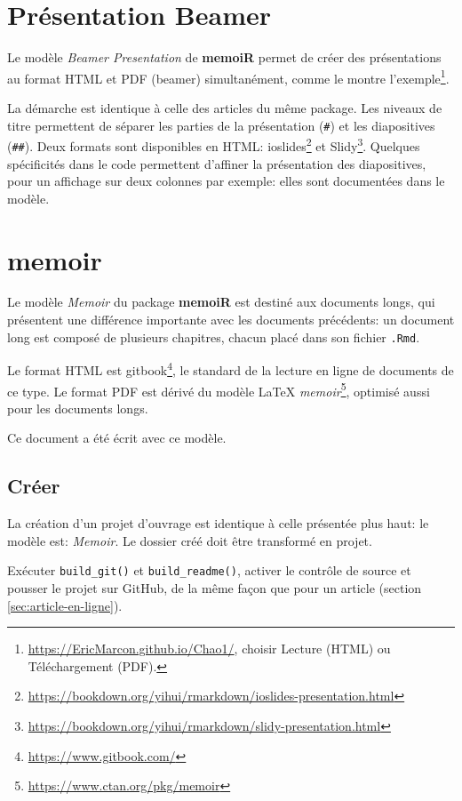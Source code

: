 \documentclass[
  12pt,
  french,
  a4paper,
  extrafontsizes,onecolumn,openright
  ]{memoir}
\begin{document}
\section{Présentation Beamer}\label{pruxe9sentation-beamer}

Le modèle \emph{Beamer Presentation} de \textbf{memoiR} permet de créer des présentations au format HTML et PDF (beamer) simultanément, comme le montre l'exemple\footnote{\url{https://EricMarcon.github.io/Chao1/}, choisir Lecture (HTML) ou Téléchargement (PDF).}.

La démarche est identique à celle des articles du même package.
Les niveaux de titre permettent de séparer les parties de la présentation (\texttt{\#}) et les diapositives (\texttt{\#\#}).
Deux formats sont disponibles en HTML: ioslides\footnote{\url{https://bookdown.org/yihui/rmarkdown/ioslides-presentation.html}} et Slidy\footnote{\url{https://bookdown.org/yihui/rmarkdown/slidy-presentation.html}}.
Quelques spécificités dans le code permettent d'affiner la présentation des diapositives, pour un affichage sur deux colonnes par exemple: elles sont documentées dans le modèle.

\section{memoir}\label{memoir}

Le modèle \emph{Memoir} du package \textbf{memoiR} est destiné aux documents longs, qui présentent une différence importante avec les documents précédents: un document long est composé de plusieurs chapitres, chacun placé dans son fichier \texttt{.Rmd}.

Le format HTML est gitbook\footnote{\url{https://www.gitbook.com/}}, le standard de la lecture en ligne de documents de ce type.
Le format PDF est dérivé du modèle LaTeX \emph{memoir}\footnote{\url{https://www.ctan.org/pkg/memoir}}, optimisé aussi pour les documents longs.

Ce document a été écrit avec ce modèle.

\subsection{Créer}\label{cruxe9er-1}

La création d'un projet d'ouvrage est identique à celle présentée plus haut: le modèle est: \emph{Memoir}.
Le dossier créé doit être transformé en projet.

Exécuter \texttt{build\_git()} et \texttt{build\_readme()}, activer le contrôle de source et pousser le projet sur GitHub, de la même façon que pour un article (section \ref{sec:article-en-ligne}).
\end{document}
